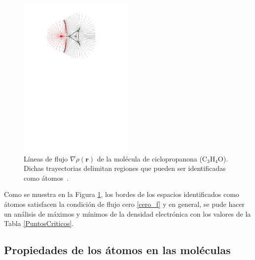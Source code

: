 \begin{figure}
  \centering
  \includegraphics[width=0.5\textwidth]{3/img/flux}
  \caption{Líneas de flujo  $\nabla \rho(\mathbf{r})$ de la molécula
  de ciclopropanona (C$_3$H$_4$O).
  Dichas trayectorias delimitan regiones que pueden ser
  identificadas como átomos~\cite{todd}.}
  \label{flux}
\end{figure}

Como se muestra en la Figura \ref{flux}, los bordes de los espacios
identificados como átomos satisfacen la condición de flujo cero \ref{cero_f} y
en general, se pude hacer un análisis de máximos y mínimos de la densidad
electrónica con los valores de la Tabla \ref{PuntosCriticos}.


\subsection{Propiedades de los átomos en las moléculas}

